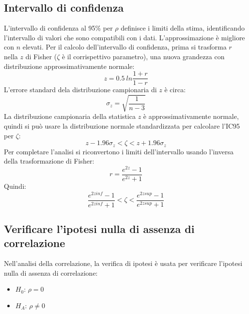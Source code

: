 \documentclass[10pt, draft]{book}
\newcommand{\tightlist}{%
\setlength{\itemsep}{1pt}\setlength{\parskip}{0pt}\setlength{\parsep}{0pt}}
\begin{document}
\subsection{Intervallo di confidenza}

L'intervallo di confidenza al 95\% per $\rho$ definisce i limiti della stima, identificando l'intervallo di valori che sono compatibili con i dati. L'approssimazione è migliore con $n$ elevati. Per il calcolo dell'intervallo di confidenza, prima si trasforma $r$ nella $z$ di Fisher ($\zeta$ è il corrispettivo parametro), una nuova grandezza con distribuzione approssimativamente normale:
\begin{equation}
    z = 0.5\ ln{\frac{1+r}{1-r}}
\end{equation}
L'errore standard dela distribuzione campionaria di $z$ è circa:
\begin{equation}
    \sigma_z = \sqrt{\frac{1}{n-3}}
\end{equation}
La distribuzione campionaria della statistica $z$ è approssimativamente normale, quindi si può usare la distribuzione normale standardizzata per calcolare l'IC95 per $\zeta$:
\begin{equation}
    z-1.96\sigma_z<\zeta<z+1.96\sigma_z
\end{equation}
Per completare l'analisi si riconvertono i limiti dell'intervallo usando l'inversa della trasformazione di Fisher:
\begin{equation}
    r = \frac{e^{2z}-1}{e^{2z}+1}
\end{equation}
Quindi:
\begin{equation}
    \frac{e^{2zinf}-1}{e^{2zinf}+1}<\zeta<\frac{e^{2zsup}-1}{e^{2zsup}+1}
\end{equation}

\subsection{Verificare l'ipotesi nulla di assenza di correlazione}

Nell'analisi della correlazione, la verifica di ipotesi è usata per verificare l'ipotesi nulla di assenza di correlazione:
\begin{itemize}\tightlist
    \item $H_0$: $\rho = 0$
    \item $H_A$: $\rho \neq 0$
\end{itemize}
\end{document}
